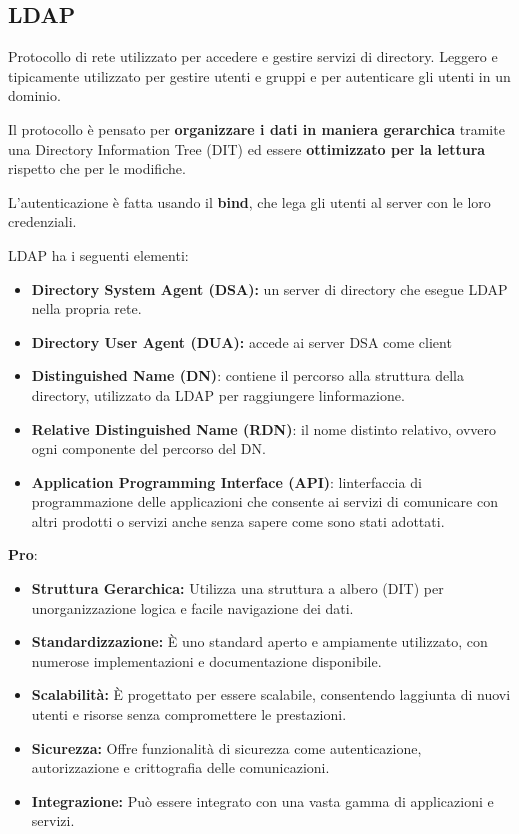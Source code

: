\subsection{LDAP}\label{ldap-1}

Protocollo di rete utilizzato per accedere e gestire servizi di
directory. Leggero e tipicamente utilizzato per gestire utenti e gruppi
e per autenticare gli utenti in un dominio.

Il protocollo è pensato per \textbf{organizzare i dati in maniera
gerarchica} tramite una Directory Information Tree (DIT) ed essere
\textbf{ottimizzato per la lettura} rispetto che per le modifiche.

L'autenticazione è fatta usando il \textbf{bind}, che lega gli utenti al
server con le loro credenziali.

LDAP ha i seguenti elementi:

\begin{itemize}
\item
  \textbf{Directory System Agent (DSA):} un server di directory che
  esegue LDAP nella propria rete.
\item
  \textbf{Directory User Agent (DUA):} accede ai server DSA come client
\item
  \textbf{Distinguished Name (DN)}: contiene il percorso alla struttura
  della directory, utilizzato da LDAP per raggiungere
  l\textquotesingle informazione.
\item
  \textbf{Relative Distinguished Name (RDN)}: il nome distinto relativo,
  ovvero ogni componente del percorso del DN.
\item
  \textbf{Application Programming Interface (API)}:
  l\textquotesingle interfaccia di programmazione delle applicazioni che
  consente ai servizi di comunicare con altri prodotti o servizi anche
  senza sapere come sono stati adottati.
\end{itemize}

\textbf{Pro}:

\begin{itemize}
\item
  \textbf{Struttura Gerarchica:} Utilizza una struttura a albero (DIT)
  per un\textquotesingle organizzazione logica e facile navigazione dei
  dati.
\item
  \textbf{Standardizzazione:} È uno standard aperto e ampiamente
  utilizzato, con numerose implementazioni e documentazione disponibile.
\item
  \textbf{Scalabilità:} È progettato per essere scalabile, consentendo
  l\textquotesingle aggiunta di nuovi utenti e risorse senza
  compromettere le prestazioni.
\item
  \textbf{Sicurezza:} Offre funzionalità di sicurezza come
  autenticazione, autorizzazione e crittografia delle comunicazioni.
\item
  \textbf{Integrazione:} Può essere integrato con una vasta gamma di
  applicazioni e servizi.
\end{itemize}

